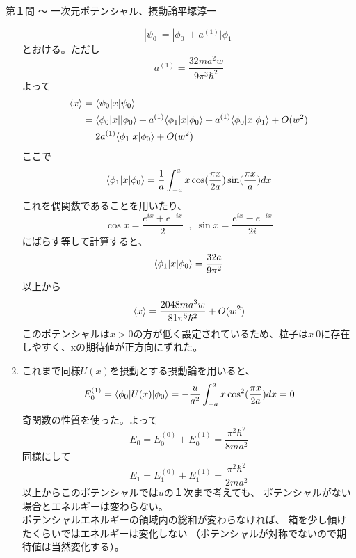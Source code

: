 \begin{answer}{第１問 〜 一次元ポテンシャル、摂動論}{平塚淳一}
\begin{enumerate}
\begin{equation}
  |\psi_0\>=|\phi_0\>+a^{(1)}|\phi_1\>
  \end{equation}
  とおける。ただし
  \begin{equation}
  a^{(1)}=\frac{32ma^2w}{9\pi^3\hbar^2}
  \end{equation}
  よって
  \begin{align}
  \langle x\rangle&=\langle\psi_0|x|\psi_0\rangle\\
  &=\langle\phi_0|x||\phi_0\rangle+a^{(1)}\langle\phi_1|x|\phi_0\rangle+a^{(1)}\langle\phi_0|x|\phi_1\rangle+O(w^2)\\
  &=2a^{(1)}\langle\phi_1|x|\phi_0\rangle+O(w^2)
  \end{align}
  ここで
  \begin{equation}
  \langle\phi_1|x|\phi_0\rangle
  =\frac{1}{a}\int_{-a}^a x\cos(\frac{\pi x}{2a})\sin(\frac{\pi x}{a})dx
  \end{equation}
  これを偶関数であることを用いたり、
  \begin{equation}
  \cos x=\frac{e^{ix}+e^{-ix}}{2} \;\; , \;\sin x=\frac{e^{ix}-e^{-ix}}{2i}
  \end{equation}
  にばらす等して計算すると、
  \begin{equation}
  \langle\phi_1|x|\phi_0\rangle=\frac{32a}{9\pi^2}
  \end{equation}
  以上から
  \begin{equation}
  \langle x\rangle=\frac{2048ma^3w}{81\pi^5\hbar^2}+O(w^2)
  \end{equation}
  このポテンシャルは$x>0$の方が低く設定されているため、粒子は$x\>0$に存在しやすく、xの期待値が正方向にずれた。
\item これまで同様$U(x)$を摂動とする摂動論を用いると、
  \begin{equation}
  E_0^{(1)}=\langle\phi_0|U(x)|\phi_0\rangle
  =-\frac{u}{a^2}\int_{-a}^ax\cos^2(\frac{\pi x}{2a})dx
  =0
  \end{equation}
  奇関数の性質を使った。よって
  \begin{equation}
  E_0=E_0^{(0)}+E_0^{(1)}
  =\frac{\pi^2\hbar^2}{8ma^2}
  \end{equation}
  同様にして
  \begin{equation}
  E_1=E_1^{(0)}+E_1^{(1)}
  =\frac{\pi^2\hbar^2}{2ma^2}
  \end{equation}
  以上からこのポテンシャルでは$u$の１次まで考えても、
  ポテンシャルがない場合とエネルギーは変わらない。\\
  ポテンシャルエネルギーの領域内の総和が変わらなければ、
  箱を少し傾けたくらいではエネルギーは変化しない
  （ポテンシャルが対称でないので期待値は当然変化する）。

\end{enumerate}
\end{answer}
